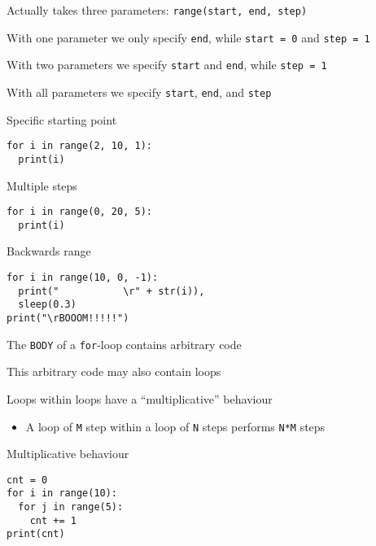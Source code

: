 \documentclass{beamer}
\begin{document}
\begin{slide}{
\item Actually takes three parameters: \texttt{range(start, end, step)}
\item With one parameter we only specify \texttt{end}, while \texttt{start = 0} and \texttt{step = 1}
\item With two parameters we specify \texttt{start} and \texttt{end}, while \texttt{step = 1}
\item With all parameters we specify \texttt{start}, \texttt{end}, and \texttt{step}
}\end{slide}

\begin{frame}[fragile]{Specific starting point}
\begin{lstlisting}
for i in range(2, 10, 1):
  print(i)
\end{lstlisting}
\end{frame}

\begin{frame}[fragile]{Multiple steps}
\begin{lstlisting}
for i in range(0, 20, 5):
  print(i)
\end{lstlisting}
\end{frame}

\begin{frame}[fragile]{Backwards range}
\begin{lstlisting}
for i in range(10, 0, -1):
  print("           \r" + str(i)),
  sleep(0.3)
print("\rBOOOM!!!!!")
\end{lstlisting}
\end{frame}

\begin{slide}{
\item The \texttt{BODY} of a \texttt{for}-loop contains arbitrary code
\item This arbitrary code may also contain loops
\item Loops within loops have a ``multiplicative'' behaviour
\begin{itemize}
\item A loop of \texttt{M} step within a loop of \texttt{N} steps performs \texttt{N*M} steps
\end{itemize}
}\end{slide}

\begin{frame}[fragile]{Multiplicative behaviour}
\begin{lstlisting}
cnt = 0
for i in range(10):
  for j in range(5):
    cnt += 1
print(cnt)
\end{lstlisting}
\end{frame}
\end{document}
